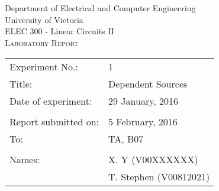 \begin{center}
	\begin{LARGE}
		Department of Electrical and Computer Engineering \\
		University of Victoria \\
		ELEC 300 - Linear Circuits II \\[1cm]
		\textsc{Laboratory Report}
		\\[1cm]
	\end{LARGE}
\end{center}

\begin{tabular}{ p{} p{} }
	Experiment No.: & 1 \\ 
	Title: & Dependent Sources \\ 
	Date of experiment:& 29 January, 2016 \\ 
	& \\
	Report submitted on:& 5 February, 2016 \\ 
	To: & TA, B07 \\ 
	& \\
	Names: & X. Y (V00XXXXXX)\\
	& T. Stephen (V00812021)  
\end{tabular}

\newpage